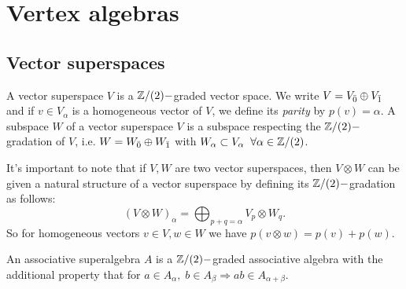 \chapter{Vertex algebras}
\section{Vector superspaces}
\begin{dang}
    \begin{definition}\label{Definition: definition of vector superspaces}\cite{de2006finite}
        A vector superspace $V$ is a $\mathbb{Z}/(2)-$graded vector space. We write $V=V_{\Bar{0}}\oplus V_{\Bar{1}}$ and if $v\in V_\alpha$ is a homogeneous vector of $V$, we define its \textit{parity} by $p(v)=\alpha$. A subspace $W$ of a vector superspace $V$ is a subspace respecting the $\mathbb{Z}/(2)-$gradation of $V$, i.e. $W=W_{\Bar{0}}\oplus W_{\Bar{1}}$ with $W_\alpha\subset V_\alpha\;\;\forall\alpha\in\mathbb{Z}/(2)$.
    \end{definition}
\end{dang}
It's important to note that if $V, W$ are two vector superspaces, then $V\otimes W$ can be given a natural structure of a vector superspace by defining its $\mathbb{Z}/(2)-$gradation as follows:
\begin{equation}\label{Equation: grading in the tensor product of superspaces}
    (V\otimes W)_\alpha=\bigoplus_{p+q=\alpha}V_p\otimes W_q.
\end{equation}
So for homogeneous vectors $v\in V,w\in W$ we have $p(v\otimes w)=p(v)+p(w)$.
\begin{dang}
    \begin{definition}\cite{kac2013bombay}
        An associative superalgebra $A$ is a $\mathbb{Z}/(2)-$graded associative algebra with the additional property that for $a\in A_{\alpha},\;b\in A_\beta\Rightarrow ab\in A_{\alpha+\beta}$.
    \end{definition}
\end{dang}

